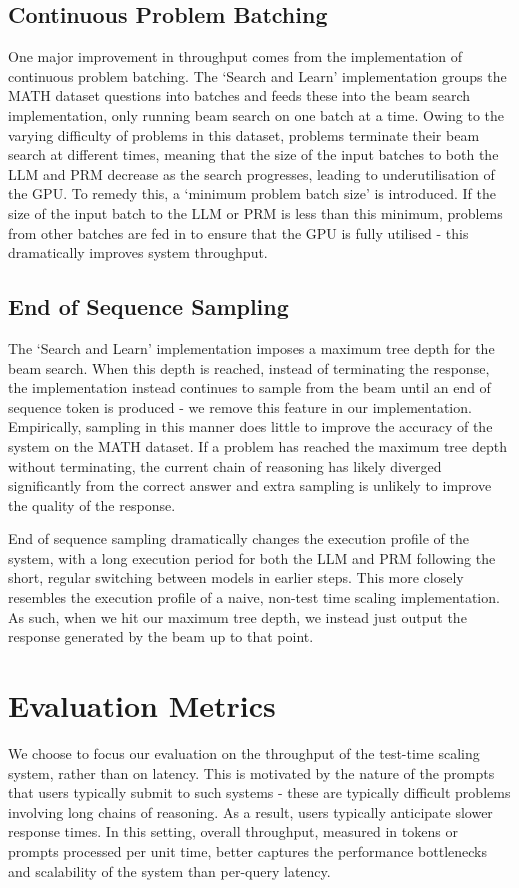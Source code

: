 \documentclass[11pt,twoside]{report}
\begin{document}
\subsection{Continuous Problem Batching}
One major improvement in throughput comes from the implementation of continuous problem batching.
The `Search and Learn' implementation groups the MATH dataset questions into batches and feeds these into the beam search implementation, only running beam search on one batch at a time.
Owing to the varying difficulty of problems in this dataset, problems terminate their beam search at different times, meaning that the size of the input batches to both the LLM and PRM decrease as the search progresses, leading to underutilisation of the GPU.
To remedy this, a `minimum problem batch size' is introduced.
If the size of the input batch to the LLM or PRM is less than this minimum, problems from other batches are fed in to ensure that the GPU is fully utilised - this dramatically improves system throughput.

\subsection{End of Sequence Sampling}
The `Search and Learn' implementation imposes a maximum tree depth for the beam search.
When this depth is reached, instead of terminating the response, the implementation instead continues to sample from the beam until an end of sequence token is produced - we remove this feature in our implementation.
Empirically, sampling in this manner does little to improve the accuracy of the system on the MATH dataset.
If a problem has reached the maximum tree depth without terminating, the current chain of reasoning has likely diverged significantly from the correct answer and extra sampling is unlikely to improve the quality of the response.

End of sequence sampling dramatically changes the execution profile of the system, with a long execution period for both the LLM and PRM following the short, regular switching between models in earlier steps.
This more closely resembles the execution profile of a naive, non-test time scaling implementation. %
As such, when we hit our maximum tree depth, we instead just output the response generated by the beam up to that point. 

\section{Evaluation Metrics}
We choose to focus our evaluation on the throughput of the test-time scaling system, rather than on latency.
This is motivated by the nature of the prompts that users typically submit to such systems - these are typically difficult problems involving long chains of reasoning.
As a result, users typically anticipate slower response times. 
In this setting, overall throughput, measured in tokens or prompts processed per unit time, better captures the performance bottlenecks and scalability of the system than per-query latency.
\end{document}
